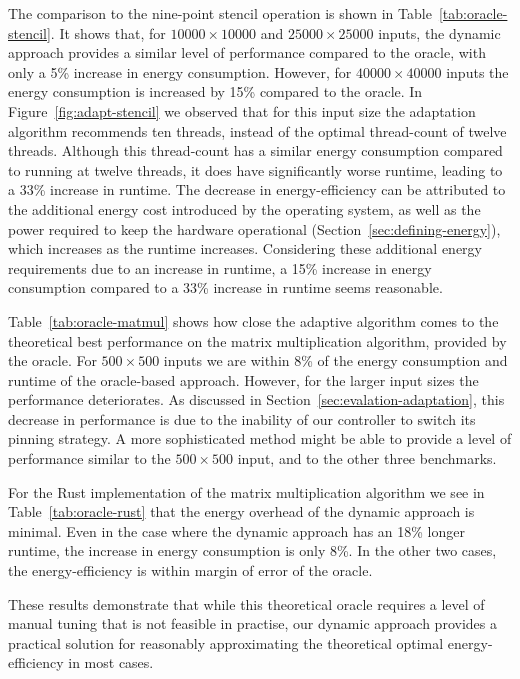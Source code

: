 The comparison to the nine-point stencil operation is shown in Table~\ref{tab:oracle-stencil}. It
shows that, for $10000 \times 10000$ and $25000 \times 25000$ inputs, the dynamic approach provides
a similar level of performance compared to the oracle, with only a 5\% increase in energy
consumption. However, for $40000 \times 40000$ inputs the energy consumption is increased by 15\%
compared to the oracle. In Figure~\ref{fig:adapt-stencil} we observed that for this input size the
adaptation algorithm recommends ten threads, instead of the optimal thread-count of twelve threads.
Although this thread-count has a similar energy consumption compared to running at twelve threads,
it does have significantly worse runtime, leading to a 33\% increase in runtime. The decrease in
energy-efficiency can be attributed to the additional energy cost introduced by the operating
system, as well as the power required to keep the hardware operational
(Section~\ref{sec:defining-energy}), which increases as the runtime increases. Considering these
additional energy requirements due to an increase in runtime, a 15\% increase in energy consumption
compared to a 33\% increase in runtime seems reasonable.

Table~\ref{tab:oracle-matmul} shows how close the adaptive algorithm comes to the theoretical best
performance on the matrix multiplication algorithm, provided by the oracle. For $500 \times 500$
inputs we are within 8\% of the energy consumption and runtime of the oracle-based approach.
However, for the larger input sizes the performance deteriorates. As discussed in
Section~\ref{sec:evalation-adaptation}, this decrease in performance is due to the inability of our
controller to switch its pinning strategy. A more sophisticated method might be able to provide a
level of performance similar to the $500 \times 500$ input, and to the other three benchmarks.

For the Rust implementation of the matrix multiplication algorithm we see in
Table~\ref{tab:oracle-rust} that the energy overhead of the dynamic approach is minimal. Even in the
case where the dynamic approach has an 18\% longer runtime, the increase in energy consumption is
only 8\%. In the other two cases, the energy-efficiency is within margin of error of the oracle.

These results demonstrate that while this theoretical oracle requires a level of manual tuning that
is not feasible in practise, our dynamic approach provides a practical solution for reasonably
approximating the theoretical optimal energy-efficiency in most cases.

